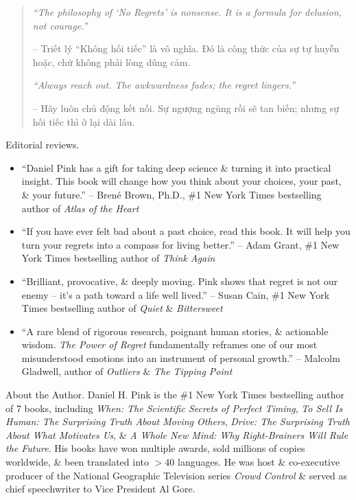 \documentclass{article}
\begin{document}
\begin{enumerate}
\begin{quotation}
		{\it``The philosophy of `No Regrets' is nonsense. It is a formula for delusion, not courage.''}

		-- Triết lý ``Không hối tiếc'' là vô nghĩa. Đó là công thức của sự tự huyễn hoặc, chứ không phải lòng dũng cảm.

		{\it``Always reach out. The awkwardness fades; the regret lingers.''}

		-- Hãy luôn chủ động kết nối. Sự ngượng ngùng rồi sẽ tan biến; nhưng sự hối tiếc thì ở lại dài lâu.
	\end{quotation}

	{\sf Editorial reviews.}
	\begin{itemize}
		\item ``{\sc Daniel Pink} has a gift for taking deep science \& turning it into practical insight. This book will change how you think about your choices, your past, \& your future.'' -- {\sc Brené Brown}, Ph.D., \#1 New York Times bestselling author of {\it Atlas of the Heart}
		\item ``If you have ever felt bad about a past choice, read this book. It will help you turn your regrets into a compass for living better.'' -- {\sc Adam Grant}, \#1 New York Times bestselling author of {\it Think Again}
		\item ``Brilliant, provocative, \& deeply moving. {\sc Pink} shows that regret is not our enemy -- it's a path toward a life well lived.'' -- {\sc Susan Cain}, \#1 New York Times bestselling author of {\it Quiet} \& {\it Bittersweet}
		\item ``A rare blend of rigorous research, poignant human stories, \& actionable wisdom. {\it The Power of Regret} fundamentally reframes one of our most misunderstood emotions into an instrument of personal growth.'' -- {\sc Malcolm Gladwell}, author of {\it Outliers} \& {\it The Tipping Point}
	\end{itemize}

	{\sf About the Author.} {\sc Daniel H. Pink} is the \#1 New York Times bestselling author of 7 books, including {\it When: The Scientific Secrets of Perfect Timing}, {\it To Sell Is Human: The Surprising Truth About Moving Others}, {\it Drive: The Surprising Truth About What Motivates Us}, \& {\it A Whole New Mind: Why Right-Brainers Will Rule the Future}. His books have won multiple awards, sold millions of copies worldwide, \& been translated into $> 40$ languages. He was host \& co-executive producer of the National Geographic Television series {\it Crowd Control} \& served as chief speechwriter to Vice President {\sc Al Gore}.




\end{enumerate}
\end{document}
